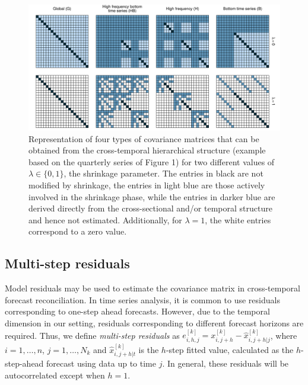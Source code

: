 \documentclass[review, 11pt]{elsarticle}
\theoremstyle{definition}
\begin{document}
\begin{figure}[!t]
	\centering
	\includegraphics[width = \linewidth]{fig/shr_color2.pdf}
	\caption{Representation of four types of covariance matrices that can be obtained from the cross-temporal hierarchical structure (example based on the quarterly series of Figure 1) for two different values of $\lambda \in \{0, 1\}$, the shrinkage parameter. The entries in black are not modified by shrinkage, the entries in light blue are those actively involved in the shrinkage phase, while the entries in darker blue are derived directly from the cross-sectional and/or temporal structure and hence not estimated. Additionally, for $\lambda = 1$, the white entries correspond to a zero value.}
	\label{fig:shr_vis}
\end{figure}

\subsection{Multi-step residuals} \label{ssec:multi_res}

Model residuals may be used to estimate the covariance matrix in cross-temporal forecast reconciliation. In time series analysis, it is common to use residuals corresponding to one-step ahead forecasts. However, due to the temporal dimension in our setting, residuals corresponding to different forecast horizons are required. Thus, we define \textit{multi-step residuals} as $e_{i,h,j}^{[k]} = x_{i,j+h}^{[k]} - \widehat{x}_{i,j+h|j}^{[k]}$, where $i = 1,\dots,n$, $j = 1,\dots,N_k$ and $\widehat{x}_{i,j+h|t}^{[k]}$ is the $h$-step fitted value, calculated as the $h$-step-ahead forecast using data up to time $j$. In general, these residuals will be autocorrelated except when $h=1$.
\end{document}
